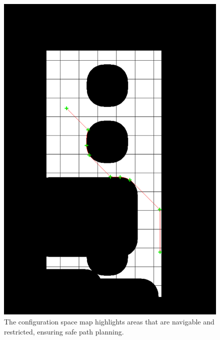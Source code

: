 \documentclass{CSSRforAfrica}
\begin{document}
\begin{figure}[H]
    \centering
    \begin{minipage}{0.49\textwidth}
        \centering
        \includegraphics[width=\linewidth]{Images/configMapWaypointsAstar.png}
        \caption{The configuration space map highlights areas that are navigable and restricted, ensuring safe path planning.}
        \label{fig:config_space_map}
    \end{minipage}
    \hfill
    \begin{minipage}{0.49\textwidth}
        \centering

\end{minipage}
\end{figure}
\end{document}
